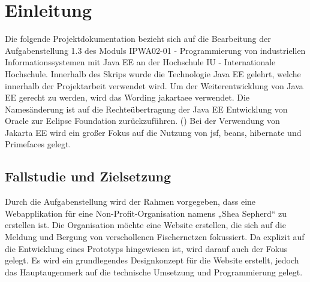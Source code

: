 \documentclass[11pt]{article}
\begin{document}
    \section{Einleitung}
    Die folgende Projektdokumentation bezieht sich auf die Bearbeitung der Aufgabenstellung 1.3 des Moduls 
    IPWA02-01 - Programmierung von industriellen Informationssystemen mit Java EE
    an der Hochschule IU - Internationale Hochschule. 
    Innerhalb des Skrips wurde die Technologie Java EE gelehrt, welche innerhalb der Projektarbeit verwendet wird.
    Um der Weiterentwicklung von Java EE gerecht zu werden, wird das Wording \gls{jakartaee} verwendet. Die Namesänderung ist auf die Rechteübertragung
    der Java EE Entwicklung von Oracle zur Eclipse Foundation zurückzuführen. 
    (\cite{jakarta_ee})
    Bei der Verwendung von Jakarta EE wird ein großer Fokus auf die Nutzung von 
    \gls{jsf},
    \gls{beans},
    \gls{hibernate} 
    und Primefaces gelegt.

    \subsection{Fallstudie und Zielsetzung}
    Durch die Aufgabenstellung wird der Rahmen vorgegeben, dass eine Webapplikation für eine Non-Profit-Organisation namens „Shea Sepherd“ zu erstellen ist. 
    Die Organisation möchte eine Website erstellen, die sich auf die Meldung und Bergung von verschollenen Fischernetzen fokussiert. Da explizit auf die Entwicklung eines Prototyps hingewiesen ist,
    wird darauf auch der Fokus gelegt. Es wird ein grundlegendes Designkonzept für die Website erstellt, jedoch das Hauptaugenmerk
    auf die technische Umsetzung und Programmierung gelegt.  
\end{document}
